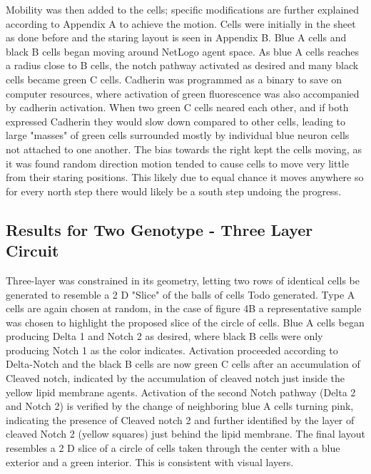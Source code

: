\documentclass[12pt]{ifacconf}
\begin{document}
Mobility was then added to the cells; specific modifications are further explained according to Appendix A to achieve the motion. Cells were initially in the sheet as done before and the staring layout is seen in Appendix B. Blue A cells and black B cells began moving around NetLogo agent space. As blue A cells reaches a radius close to B cells, the notch pathway activated as desired and many black cells became green C cells. Cadherin was programmed as a binary to save on computer resources, where activation of green fluorescence was also accompanied by cadherin activation. When two green C cells neared each other, and if both expressed Cadherin they would slow down compared to other cells, leading to large "masses" of green cells surrounded mostly by individual blue neuron cells not attached to one another. The bias towards the right kept the cells moving, as it was found random direction motion tended to cause cells to move very little from their staring positions. This likely due to equal chance it moves anywhere so for every north step there would likely be a south step undoing the progress. 

\subsection{Results for Two Genotype - Three Layer Circuit} 

Three-layer was constrained in its geometry, letting two rows of identical cells be generated to resemble a 2 D "Slice" of the balls of cells Todo generated. Type A cells are again chosen at random, in the case of figure 4B a representative sample was chosen to highlight the proposed slice of the circle of cells. Blue A cells began producing Delta 1 and Notch 2 as desired, where black B cells were only producing Notch 1 as the color indicates. Activation proceeded according to Delta-Notch and the black B cells are now green C cells after an accumulation of Cleaved notch, indicated by the accumulation of cleaved notch just inside the yellow lipid membrane agents. Activation of the second Notch pathway (Delta 2 and Notch 2) is verified by the change of neighboring blue A cells turning pink, indicating the presence of Cleaved notch 2 and further identified by the layer of cleaved Notch 2 (yellow squares) just behind the lipid membrane. The final layout resembles a 2 D slice of a circle of cells taken through the center with a blue exterior and a green interior. This is consistent with \cite{TP:18} visual layers.
\end{document}
